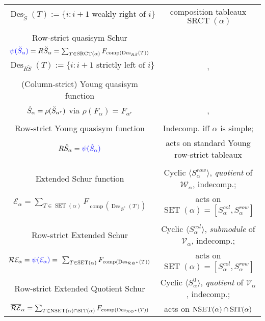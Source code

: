\documentclass[12pt,letterpaper]{amsart}
\newcommand{\svw}{\textcolor{black}}
\theoremstyle{definition}
\DeclareMathOperator{\comp}{comp}
\newcommand{\dI}{\mathfrak{S}^*}
\newcommand{\rdI}{\mathcal{R}\mathfrak{S}^*}
\DeclareMathOperator{\Des}{Des}
\newcommand{\SET}{\ensuremath{\operatorname{SET}}} \newcommand{\NSET}{\ensuremath{\operatorname{NSET}}}\newcommand{\SRCT}{\ensuremath{\operatorname{SRCT}}}
\begin{document}
\begin{table}[htbp]
\begin{center}
{\begin{tabular}{|c|c|}
$\Des_{\check S}({T}):=\{i: i+1 \text{ weakly right of } i\}$ & composition tableaux  $\SRCT(\alpha)$\\[2pt]
 \cite{HLMvW2011} & \cite{TvW2015}\\[2pt]\hline
Row-strict quasisym Schur & \\[2pt]
$\textcolor{blue}{\psi(\check S_\alpha)}=R\check S_\alpha=\sum_{T\in\SRCT(\alpha)} F_{\mathrm{comp}(\Des_{R\check S}({T}))}$ &\\[2pt]
$\Des_{R\check S}({T}):=\{i: i+1 \text{ strictly left of } i\}$ & \cite[Chapter 4]{LMvW2013}, \cite{BS2021}\\[2pt] 
  \cite{MR2014} & \\[2pt]\hline
(Column-strict) Young quasisym function  & \\[2pt]
$ \svw{\hat{S}_\alpha} = \rho(\check{S}_{\alpha^r})$ via $\rho(F_\alpha)=F_{\alpha^r}$ &
\cite[Chapter 4]{LMvW2013}, \cite{TvW2015}\\[2pt]
\cite{LMvW2013}  & \\
[2pt]\hline
Row-strict Young quasisym function  & Indecomp. iff $\alpha$ is simple;\\[2pt]
$R\hat S_\alpha = \textcolor{blue}{\psi(\hat {S}_{\alpha})}$  & acts on standard Young row-strict tableaux \\[2pt] 
 \cite{MN2015} & \cite{BS2021}\\[2pt]\hline Extended Schur function & Cyclic $\langle S^{row}_\alpha \rangle$, \textit{quotient} of $\mathcal{W}_\alpha$,  indecomp.;  \T \\[2pt]
$\mathcal{E}_\alpha= \sum_{T\in \SET(\alpha)} F_{\comp(\Des_{\dI}(T))}$ & acts on $\SET(\alpha)=[S^{col}_\alpha, S^{row}_\alpha]$ \\[2pt]
 \cite{AS2019}&  \cite{S2020}\\[2pt]\hline\hline Row-strict Extended  Schur  & Cyclic $\langle S^{col}_\alpha \rangle$, \textit{submodule} of $\mathcal{V}_\alpha$, 
indecomp.; \T\\[2pt]
$\mathcal{R}{\mathcal{E}}_\alpha=\textcolor{blue}{\psi(\mathcal{E}_\alpha)}=\ \sum_{T\in \SET(\alpha)} F_{\mathrm{comp}(\Des_{\rdI}(T))}$ 
 & acts on $\SET(\alpha)=[S^{col}_\alpha, S^{row}_\alpha]$\\[2pt]
 \hline  Row-strict Extended Quotient Schur  & Cyclic  $\langle S^0_\alpha \rangle$, \textit{quotient} of $\mathcal{V}_\alpha$, indecomp.; \T \\[2pt]
$ \overline{\mathcal{R}\mathcal{E}}_\alpha= \sum_{T\in \NSET(\alpha)\cap\SIT(\alpha)} F_{\mathrm{comp}(\Des_{\rdI}(T))}$ &  acts on $\NSET(\alpha)\cap\SIT(\alpha)$\\[2pt]

\end{tabular}}
\end{center}
\end{table}
\end{document}
